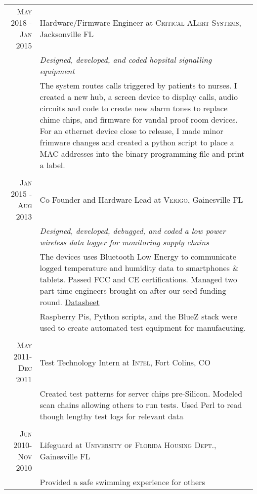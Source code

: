 \documentclass[a4paper,10pt]{article} %
\begin{document}
\begin{tabular}{r|p{11cm}}


\textsc{May 2018 - Jan 2015} &  Hardware/Firmware Engineer at \textsc{Critical ALert Systems}, Jacksonville FL \\
& \emph{Designed, developed, and coded hopsital signalling equipment}\\
&\footnotesize{The system routes calls triggered by patients to nurses. I created a new hub, a screen device to display calls, audio circuits and code to create new alarm tones to replace chime chips, and firmware for vandal proof room devices. For an ethernet device close to release, I made minor frimware changes and created a python script to place a MAC addresses into the binary programming file and print a label.}\\
\multicolumn{2}{c}{} \\

\textsc{Jan 2015 - Aug 2013} &  Co-Founder and Hardware Lead at \textsc{Verigo}, Gainesville FL \\
& \emph{Designed, developed, debugged, and coded a low power wireless data logger for monitoring supply chains}\\
&\footnotesize{The devices uses Bluetooth Low Energy to communicate logged temperature and humidity data to smartphones \& tablets. Passed FCC and CE certifications. Managed two part time engineers brought on after our seed funding round. \href{http://verigo.io/hardware.html}{Datasheet}}\\
&\footnotesize{Raspberry Pis, Python scripts, and the BlueZ stack were used to create automated test equipment for manufacuting.}\\
\multicolumn{2}{c}{} \\


\textsc{May 2011-Dec 2011} & Test Technology Intern at \textsc{Intel}, Fort Colins, CO \emph{}\\
& \footnotesize{Created test patterns for server chips pre-Silicon. Modeled scan chains allowing others to run tests. Used Perl to read though lengthy test logs for relevant data}\\
\multicolumn{2}{c}{} \\


\textsc{Jun 2010-Nov 2010} & Lifeguard at \textsc{University of Florida Housing Dept.}, Gainesville FL \emph{}\\
& \footnotesize{Provided a safe swimming experience for others}\\
\end{tabular}
\end{document}
